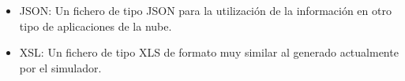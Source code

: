 \documentclass{article}
\begin{document}
\begin{itemize}
\begin{item}
\begin{itemize}
\item JSON: Un fichero de tipo JSON para la utilización de la información en otro tipo de aplicaciones de la nube. 
\item XSL: Un fichero de tipo XLS de formato muy similar al generado actualmente por el simulador. 

\end{itemize}
\end{item}

\end{itemize}
\end{document}
